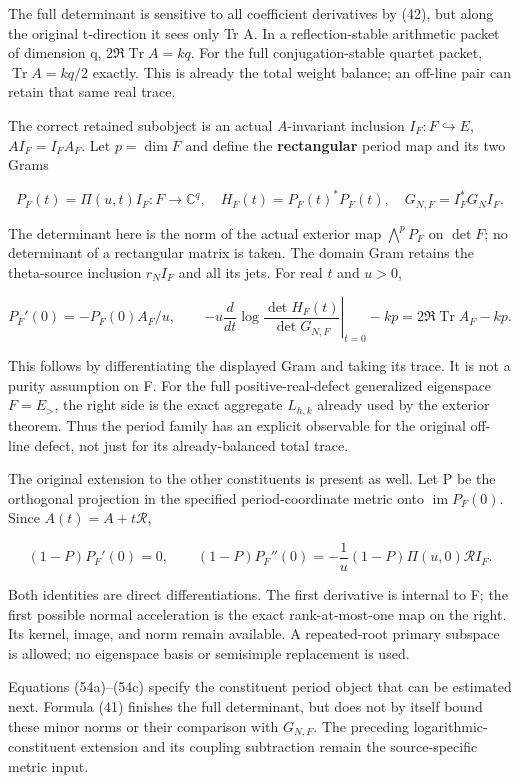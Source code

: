 \documentclass[
  11pt,
]{article}
\begin{document}
The full determinant is sensitive to all coefficient derivatives by
(42), but along the original t-direction it sees only Tr A. In a
reflection-stable arithmetic packet of dimension q,
\(2\Re\operatorname{Tr}A=kq\). For the full conjugation-stable quartet
packet, \(\operatorname{Tr}A=kq/2\) exactly. This is already the total
weight balance; an off-line pair can retain that same real trace.

The correct retained subobject is an actual \(A\)-invariant inclusion
\(I_F:F\hookrightarrow E\), \(AI_F=I_FA_F\). Let \(p=\dim F\) and define
the \textbf{rectangular} period map and its two Grams

\[
P_F(t)=\Pi(u,t)I_F:F\longrightarrow\mathbb C^q,
\quad H_F(t)=P_F(t)^*P_F(t),
\quad G_{N,F}=I_F^*G_NI_F.
\tag{54a}
\]

The determinant here is the norm of the actual exterior map
\(\bigwedge^p P_F\) on \(\det F\); no determinant of a rectangular
matrix is taken. The domain Gram retains the theta-source inclusion
\(r_NI_F\) and all its jets. For real \(t\) and \(u>0\),

\[
P_F'(0)=-P_F(0)A_F/u,
\qquad
\boxed{-u\left.\frac d{dt}\log\frac{\det H_F(t)}{\det G_{N,F}}\right|_{t=0}-kp
 =2\Re\operatorname{Tr}A_F-kp.}
\tag{54b}
\]

This follows by differentiating the displayed Gram and taking its trace.
It is not a purity assumption on F. For the full positive-real-defect
generalized eigenspace \(F=E_>\), the right side is the exact aggregate
\(L_{h,k}\) already used by the exterior theorem. Thus the period family
has an explicit observable for the original off-line defect, not just
for its already-balanced total trace.

The original extension to the other constituents is present as well. Let
P be the orthogonal projection in the specified period-coordinate metric
onto \(\operatorname{im}P_F(0)\). Since \(A(t)=A+t\mathcal R\),

\[
\boxed{(1-P)P_F'(0)=0,\qquad
(1-P)P_F''(0)=-\frac1u(1-P)\Pi(u,0)\mathcal R I_F.}
\tag{54c}
\]

Both identities are direct differentiations. The first derivative is
internal to F; the first possible normal acceleration is the exact
rank-at-most-one map on the right. Its kernel, image, and norm remain
available. A repeated-root primary subspace is allowed; no eigenspace
basis or semisimple replacement is used.

Equations (54a)--(54c) specify the constituent period object that can be
estimated next. Formula (41) finishes the full determinant, but does not
by itself bound these minor norms or their comparison with \(G_{N,F}\).
The preceding logarithmic-constituent extension and its coupling
subtraction remain the source-specific metric input.
\end{document}
